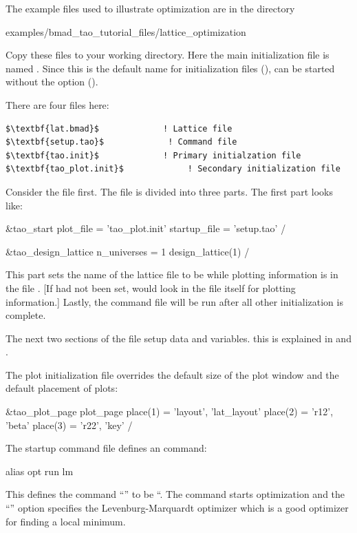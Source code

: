 \documentclass{hitec}
\begin{document}
The example files used to illustrate optimization are in the directory 
\begin{code}
examples/bmad_tao_tutorial_files/lattice_optimization
\end{code}
Copy these files to your working directory. Here the main initialization file is named
. Since this is the default name for initialization files (), \tao
can be started without the  option ().

There are four files here:
\begin{lstlisting}[mathescape]
$\textbf{lat.bmad}$             ! Lattice file
$\textbf{setup.tao}$             ! Command file
$\textbf{tao.init}$             ! Primary initialzation file
$\textbf{tao_plot.init}$             ! Secondary initialization file
\end{lstlisting}

Consider the file  first. The file is divided into three parts. The first part looks like:
\begin{code}
&tao_start
  plot_file = 'tao_plot.init' 
  startup_file = 'setup.tao'
/

&tao_design_lattice
  n_universes = 1
  design_lattice(1)%
/
\end{code}
This part sets the name of the lattice file to be  while plotting information is in the
file . [If  had not been set, \tao would look in the  file
itself for plotting information.] Lastly, the command file  will be run after all other 
initialization is complete. 

The next two sections of the  file setup data and variables. this is explained in 
and .

The plot initialization file  overrides the default size of the plot window and
the default placement of plots:
\begin{code}
&tao_plot_page
  plot_page%
  place(1) = 'layout', 'lat_layout'
  place(2) = 'r12', 'beta'
  place(3) = 'r22', 'key'
/
\end{code}

The startup command file  defines an  command:
\begin{code}
alias opt run lm
\end{code}
This defines the command ``'' to be ``. The  command starts optimization and the ``''
option specifies the Levenburg-Marquardt optimizer which is a good optimizer for finding a local minimum.
\end{document}
